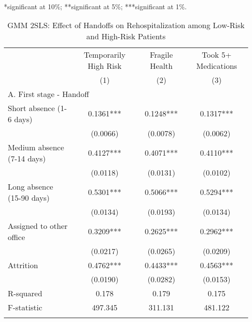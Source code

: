 \documentclass[final,12pt, notitlepage]{article}
\begin{document}
\begin{singlespace}
\begin{table}[H]
\begin{threeparttable}
\begin{tablenotes}
	*significant at 10\%; **significant at 5\%; ***significant at 1\%.
	\end{tablenotes}
\end{threeparttable}
\end{table}



\begin{table}[H]
\footnotesize
\setlength\tabcolsep{0pt}
\centering
\caption{GMM 2SLS: Effect of Handoffs on Rehospitalization among Low-Risk and High-Risk Patients}
\label{tab:iv_byseverity}
\begin{threeparttable}
{
\def\sym#1{\ifmmode^{#1}\else\(^{#1}\)\fi}
\begin{tabular*}{\textwidth}{l@{\extracolsep{\fill}}*{3}{c}} %
\toprule
& {Temporarily High Risk} & {Fragile Health} & {Took 5+ Medications}\\
                    &\multicolumn{1}{c}{(1)}&\multicolumn{1}{c}{(2)}&\multicolumn{1}{c}{(3)}\\
\midrule
\multicolumn{4}{l}{A. First stage - Handoff} \\
Short absence (1-6 days) &      0.1361*** &      0.1248*** &      0.1317***\\
                    &    (0.0066)      &    (0.0078)      &    (0.0062)   \\
Medium absence (7-14 days)&      0.4127*** &      0.4071*** &      0.4110***\\
                     &    (0.0118)       &    (0.0131)    &    (0.0102)   \\
Long absence (15-90 days)&      0.5301*** &      0.5066*** &      0.5294***\\
                   &    (0.0134)      &    (0.0193)     &    (0.0134)   \\
Assigned to other office&      0.3209*** &      0.2625*** &      0.2962***\\
                  &    (0.0217)       &    (0.0265)    &    (0.0209)   \\
Attrition       &      0.4762***  &      0.4433***  &      0.4563***\\
                 &    (0.0190)        &    (0.0282)     &    (0.0153)   \\
R-squared        &       0.178       &       0.179    &       0.175   \\
F-statistic       &     497.345     &     311.131     &     481.122   \\
\\

\end{tabular*}}
\end{threeparttable}
\end{table}
\end{singlespace}
\end{document}
